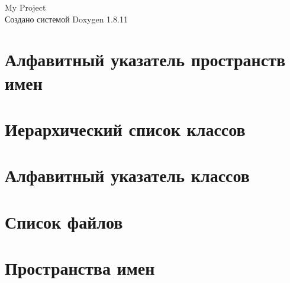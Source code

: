 \documentclass[twoside]{book}
\newcommand{\+}{\discretionary{\mbox{\scriptsize$\hookleftarrow$}}{}{}}
\newcommand{\clearemptydoublepage}{%
  \newpage{\pagestyle{empty}\cleardoublepage}%
}
\begin{document}
\hypersetup{pageanchor=false,
             bookmarksnumbered=true,
             pdfencoding=unicode
            }
\begin{titlepage}
\vspace*{7cm}
\begin{center}%
{\Large My Project }\\
\vspace*{1cm}
{\large Создано системой Doxygen 1.8.11}\\
\end{center}
\end{titlepage}
\clearemptydoublepage
\tableofcontents
\clearemptydoublepage
{}
\hypersetup{pageanchor=true}

\chapter{Алфавитный указатель пространств имен}

\chapter{Иерархический список классов}

\chapter{Алфавитный указатель классов}

\chapter{Список файлов}

\chapter{Пространства имен}




\end{document}
